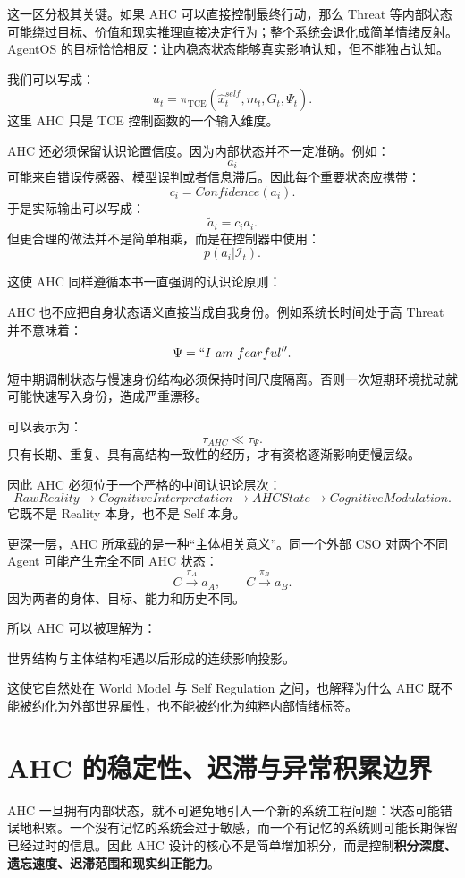 这一区分极其关键。如果 AHC 可以直接控制最终行动，那么 Threat 等内部状态可能绕过目标、价值和现实推理直接决定行为；整个系统会退化成简单情绪反射。AgentOS 的目标恰恰相反：让内稳态状态能够真实影响认知，但不能独占认知。

我们可以写成：
\[
u_t
=
\pi_{\mathrm{TCE}}
(
\hat x_t^{self},
m_t,
G_t,
\Psi_t
).
\]
这里 AHC 只是 TCE 控制函数的一个输入维度。

AHC 还必须保留认识论置信度。因为内部状态并不一定准确。例如：
\[
a_i
\]
可能来自错误传感器、模型误判或者信息滞后。因此每个重要状态应携带：
\[
c_i
=
Confidence(a_i).
\]
于是实际输出可以写成：
\[
\tilde a_i
=
c_i a_i.
\]
但更合理的做法并不是简单相乘，而是在控制器中使用：
\[
p(a_i|\mathcal I_t).
\]

这使 AHC 同样遵循本书一直强调的认识论原则：
\begin{statementbox}
\centering
{}
\end{statementbox}

AHC 也不应把自身状态语义直接当成自我身份。例如系统长时间处于高 Threat 并不意味着：
\[
\Psi
=
``I\ am\ fearful''.
\]
短中期调制状态与慢速身份结构必须保持时间尺度隔离。否则一次短期环境扰动就可能快速写入身份，造成严重漂移。

可以表示为：
\[
\tau_{AHC}
\ll
\tau_{\Psi}.
\]
只有长期、重复、具有高结构一致性的经历，才有资格逐渐影响更慢层级。

因此 AHC 必须位于一个严格的中间认识论层次：
\[
RawReality
\rightarrow
CognitiveInterpretation
\rightarrow
AHCState
\rightarrow
CognitiveModulation.
\]
它既不是 Reality 本身，也不是 Self 本身。

更深一层，AHC 所承载的是一种“主体相关意义”。同一个外部 CSO 对两个不同 Agent 可能产生完全不同 AHC 状态：
\[
C
\xrightarrow{\pi_A}
a_A,
\qquad
C
\xrightarrow{\pi_B}
a_B.
\]
因为两者的身体、目标、能力和历史不同。

所以 AHC 可以被理解为：
\begin{statementbox}
世界结构与主体结构相遇以后形成的连续影响投影。
\end{statementbox}
这使它自然处在 World Model 与 Self Regulation 之间，也解释为什么 AHC 既不能被约化为外部世界属性，也不能被约化为纯粹内部情绪标签。

\section{AHC 的稳定性、迟滞与异常积累边界}

AHC 一旦拥有内部状态，就不可避免地引入一个新的系统工程问题：状态可能错误地积累。一个没有记忆的系统会过于敏感，而一个有记忆的系统则可能长期保留已经过时的信息。因此 AHC 设计的核心不是简单增加积分，而是控制\textbf{积分深度、遗忘速度、迟滞范围和现实纠正能力}。

